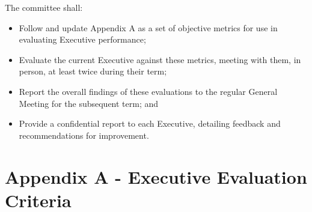 \documentclass[12pt, letterpaper]{article}
\begin{document}
The committee shall:
\begin{itemize}
	\item Follow and update Appendix A as a set of objective metrics for use in evaluating Executive performance;
	\item Evaluate the current Executive against these metrics, meeting with them, in person, at least twice during their term;
	\item Report the overall findings of these evaluations to the regular General Meeting for the subsequent term;
	and
	\item Provide a confidential report to each Executive, detailing feedback and recommendations for improvement.
\end{itemize}

\section*{Appendix A - Executive Evaluation Criteria}
\end{document}
